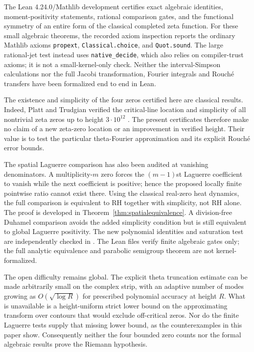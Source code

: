 The Lean 4.24.0/Mathlib development
certifies exact algebraic identities,
moment-positivity statements, rational
comparison gates, and the functional
symmetry of an entire form of
the classical completed zeta function.
For these small algebraic theorems,
the recorded axiom inspection reports
the ordinary Mathlib axioms
\texttt{propext}, \texttt{Classical.choice},
and \texttt{Quot.sound}.
The large rational-jet test instead
uses \texttt{native\_decide}, which
also relies on compiler-trust axioms;
it is not a small-kernel-only check.
Neither the interval-Simpson
calculations nor the full
Jacobi transformation, Fourier
integrals and Rouch\'e transfers
have been formalized end to end
in Lean.

The existence and simplicity of
the four zeros certified here
are classical results. Indeed,
Platt and Trudgian verified the
critical-line location and
simplicity of all nontrivial
zeta zeros up to height
$3\cdot10^{12}$ \cite{PlattTrudgian}.
The present certificates therefore
make no claim of a new zeta-zero
location or an improvement in
verified height. Their value is
to test the particular theta-Fourier
approximation and its explicit
Rouch\'e error bounds.

The spatial Laguerre comparison has also been
audited at vanishing denominators.
A multiplicity-$m$ zero forces the
$(m-1)$st Laguerre coefficient to
vanish while the next coefficient
is positive; hence the proposed
locally finite pointwise ratio
cannot exist there.
Using the classical real-zero
heat dynamics, the full comparison
is equivalent to RH together
with simplicity, not RH alone.
The proof is developed in
Theorem~\ref{thm:spatialequivalence}.
A division-free Duhamel
comparison avoids the added
simplicity condition but is still
equivalent to global Laguerre
positivity. The new polynomial
identities and saturation test
are independently checked in
.
The Lean files verify finite
algebraic gates only; the full
analytic equivalence and
parabolic semigroup theorem
are not kernel-formalized.

The open difficulty remains global.
The explicit theta truncation estimate
can be made arbitrarily small on the
complex strip, with an adaptive
number of modes growing as
$O(\sqrt{\log R})$ for prescribed
polynomial accuracy at height $R$.
What is unavailable is a
height-uniform strict lower bound
on the approximating transform
over contours that would exclude
off-critical zeros. Nor do the
finite Laguerre tests supply that
missing lower bound, as the
counterexamples in this paper show.
Consequently neither the four
bounded zero counts nor the
formal algebraic results prove
the Riemann hypothesis.

